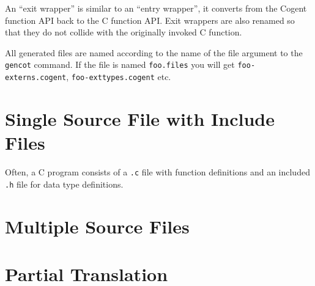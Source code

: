 \documentclass[a4paper]{report}
\newcommand{\code}[1]{\textnormal{\texttt{#1}}}
\begin{document}
An ``exit wrapper'' is similar to an ``entry wrapper'', it converts from the Cogent function API back to the C function API.
Exit wrappers are also renamed so that they do not collide with the originally invoked C function.

All generated files are named according to the name of the file argument to the \code{gencot} command. If the file is named 
\code{foo.files} you will get \code{foo-externs.cogent}, \code{foo-exttypes.cogent} etc.

\section{Single Source File with Include Files}
\label{simple-include}

Often, a C program consists of a \code{.c} file with function definitions and an included \code{.h} file for data type 
definitions.

\section{Multiple Source Files}
\label{simple-multi}

\section{Partial Translation}
\label{simple-partial}
\end{document}

